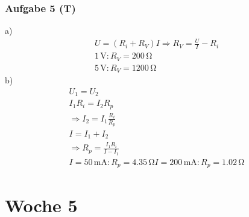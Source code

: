 \documentclass{article}
\begin{document}
\subsubsection*{Aufgabe 5 (T)}
a)\begin{eqnarray*}
    U=(R_i+R_V)I \Rightarrow R_V = \frac{U}{I}-R_i\\
    1\,\mathrm{V}: R_V = 200\,\mathrm{\Omega}\\
    5\,\mathrm{V}: R_V = 1200\,\mathrm{\Omega}
\end{eqnarray*}
b)\begin{eqnarray*}
    U_1 = U_2\\
    I_1R_i = I_2R_p\\
    \Rightarrow I_2 = I_1\frac{R_i}{R_p}\\
    I=I_1+I_2\\
    \Rightarrow R_p = \frac{I_1R_i}{I - I_1}\\
    I=50\,\mathrm{mA}:  R_p = 4.35\,\mathrm{\Omega}
    I=200\,\mathrm{mA}:  R_p = 1.02\,\mathrm{\Omega}
\end{eqnarray*}

\section*{Woche 5}
\end{document}
